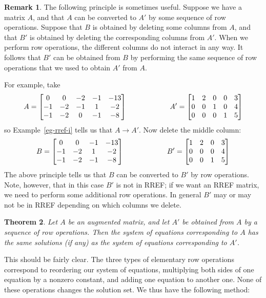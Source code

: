 \documentclass[reqno]{amsart}
\newtheorem{theorem}{Theorem}[section]
\theoremstyle{definition}
\newtheorem{remark}[theorem]{Remark}
\begin{document}
\begin{remark}\label{rem-delete-cols}
 The following principle is sometimes useful.  Suppose we have a
 matrix $A$, and that $A$ can be converted to $A'$ by some sequence of
 row operations.  Suppose that $B$ is obtained by deleting some
 columns from $A$, and that $B'$ is obtained by deleting the
 corresponding columns from $A'$.  When we perform row operations, the
 different columns do not interact in any way.  It follows that $B'$
 can be obtained from $B$ by performing the same sequence of row
 operations that we used to obtain $A'$ from $A$.

 For example, take
 \[ A =
     \left[\begin{matrix}
      0 & 0 & -2 & -1 & -13 \\
     -1 & -2 & -1 & 1 & -2 \\
     -1 & -2 & 0 & -1 & -8
     \end{matrix}\right]  \hspace{6em}
    A' =
     \left[\begin{matrix}
      1 & 2 & 0 & 0 & 3 \\
      0 & 0 & 1 & 0 & 4 \\
      0 & 0 & 0 & 1 & 5
     \end{matrix}\right]
 \]
 so Example~\ref{eg-rref-i} tells us that $A\to A'$.  Now delete the
 middle column:
 \[ B =
     \left[\begin{matrix}
      0 &  0 & -1 & -13 \\
     -1 & -2 &  1 &  -2 \\
     -1 & -2 & -1 &  -8
     \end{matrix}\right]  \hspace{6em}
    B' =
     \left[\begin{matrix}
      1 & 2 & 0 & 3 \\
      0 & 0 & 0 & 4 \\
      0 & 0 & 1 & 5
     \end{matrix}\right]
 \]
 The above principle tells us that $B$ can be converted to $B'$ by row
 operations.  Note, however, that in this case $B'$ is not in RREF; if
 we want an RREF matrix, we need to perform some additional row
 operations.  In general $B'$ may or may not be in RREF depending on
 which columns we delete.
\end{remark}

\begin{theorem}\label{thm-row-ops}
 Let $A$ be an augmented matrix, and let $A'$ be obtained from $A$ by a
 sequence of row operations.  Then the system of equations
 corresponding to $A$ has the same solutions (if any) as the system of
 equations corresponding to $A'$.
\end{theorem}

This should be fairly clear.  The three types of elementary row
operations correspond to reordering our system of equations,
multiplying both sides of one equation by a nonzero constant, and
adding one equation to another one.  None of these operations changes
the solution set.  We thus have the following method:
\end{document}

